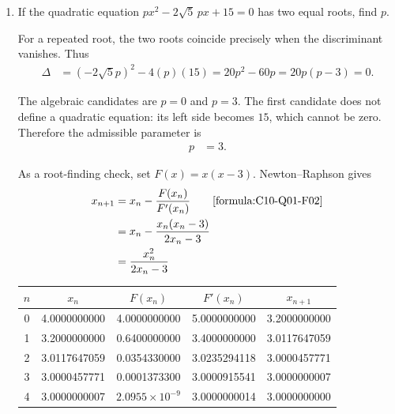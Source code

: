\begin{enumerate}[label=\thesubsection.\arabic*, ref=\thesubsection.\theenumi]
    \item
    \label{question:C10-Q01}
    \label{question-short:C10-Q01} If the quadratic equation $px^2-2\sqrt5\,px+15=0$ has two equal roots, find $p$.
    
    \par
    \smallskip
    \solution

    For a repeated root, the two roots coincide precisely when the discriminant vanishes. Thus
    \begin{align*}
        \Delta & =(-2\sqrt5p)^2-4(p)(15)=20p^2-60p=20p(p-3)=0.
    \end{align*}

    The algebraic candidates are $p=0$ and $p=3$. The first candidate does not define a quadratic equation: its left side becomes $15$, which cannot be zero. Therefore the admissible parameter is
    \begin{align*}
        p & =3.
    \end{align*}

    As a root-finding check, set $F(x)=x(x-3)$. Newton--Raphson gives
\begin{align*}
    x_{n+1} &= x_n-\frac{F(x_n)}{F'(x_n)}
    \tag*{\eqref{formula:C10-Q01-F02}}\\
            &= x_n-\frac{x_n(x_n-3)}{2x_n-3}\\
            &= \frac{x_n^2}{2x_n-3}
\end{align*}
    \par

    \begin{center}
\small
\begin{tabular}{c|c|c|c|c}
\hline
$n$ & $x_n$ & $F(x_n)$ & $F'(x_n)$ & $x_{n+1}$ \\
\hline
0 & 4.0000000000 & 4.0000000000
  & 5.0000000000 & 3.2000000000 \\

1 & 3.2000000000 & 0.6400000000
  & 3.4000000000 & 3.0117647059 \\

2 & 3.0117647059 & 0.0354330000
  & 3.0235294118 & 3.0000457771 \\

3 & 3.0000457771 & 0.0001373300
  & 3.0000915541 & 3.0000000007 \\

4 & 3.0000000007 & $2.0955\times10^{-9}$
  & 3.0000000014 & 3.0000000000 \\


\end{tabular}
\end{center}
\end{enumerate}
